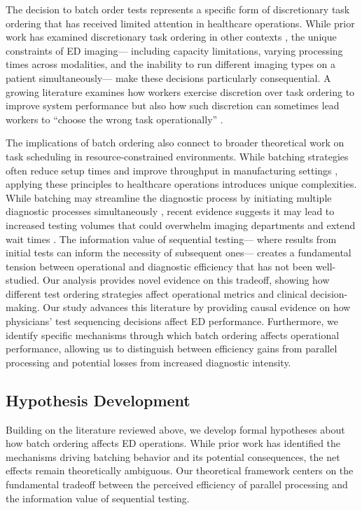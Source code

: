 \documentclass[,,nonblindrev]{informs}
\begin{document}
The decision to batch order tests represents a specific form of
discretionary task ordering that has received limited attention in
healthcare operations. While prior work has examined discretionary task
ordering in other contexts \citep[\citet{Ibanez2020}]{Ibanez2018}, the
unique constraints of ED imaging--- including capacity limitations,
varying processing times across modalities, and the inability to run
different imaging types on a patient simultaneously--- make these
decisions particularly consequential. A growing literature examines how
workers exercise discretion over task ordering to improve system
performance \citep[\citet{Campbell2011}]{vanDonselaar2010ordering} but
also how such discretion can sometimes lead workers to ``choose the
wrong task operationally'' \citep{boudreau2003interface}.

The implications of batch ordering also connect to broader theoretical
work on task scheduling in resource-constrained environments. While
batching strategies often reduce setup times and improve throughput in
manufacturing settings \citep{Fowler2022}, applying these principles to
healthcare operations introduces unique complexities. While batching may
streamline the diagnostic process by initiating multiple diagnostic
processes simultaneously \citep{song2017closing}, recent evidence
suggests it may lead to increased testing volumes that could overwhelm
imaging departments and extend wait times
\citep[\citet{saghafian2015operations}]{Jessome2020}. The information
value of sequential testing--- where results from initial tests can
inform the necessity of subsequent ones--- creates a fundamental tension
between operational and diagnostic efficiency that has not been
well-studied. Our analysis provides novel evidence on this tradeoff,
showing how different test ordering strategies affect operational
metrics and clinical decision-making. Our study advances this literature
by providing causal evidence on how physicians' test sequencing
decisions affect ED performance. Furthermore, we identify specific
mechanisms through which batch ordering affects operational performance,
allowing us to distinguish between efficiency gains from parallel
processing and potential losses from increased diagnostic intensity.

\subsection{Hypothesis Development}\label{hypothesis-development}

Building on the literature reviewed above, we develop formal hypotheses
about how batch ordering affects ED operations. While prior work has
identified the mechanisms driving batching behavior and its potential
consequences, the net effects remain theoretically ambiguous. Our
theoretical framework centers on the fundamental tradeoff between the
perceived efficiency of parallel processing and the information value of
sequential testing.
\end{document}
